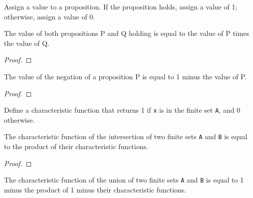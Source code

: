 \begin{definition}\label{toInt}
  \leanok
  Assign a value to a proposition. If the proposition holds, assign a value of 1; otherwise, assign a value of 0.
\end{definition}

\begin{lemma}\label{toInt_and}
  \leanok
  The value of both propositions P and Q holding is equal to the value of P times the value of Q.
\end{lemma}

\begin{proof}
  \leanok
\end{proof}

\begin{lemma}\label{toInt_not}
  \leanok
  The value of the negation of a proposition P is equal to 1 minus the value of P.
\end{lemma}

\begin{proof}
  \leanok
\end{proof}

\begin{definition}\label{char_fun}
  \leanok
  Define a characteristic function that returns 1 if \verb|x| is in the finite set \verb|A|, and 0 otherwise.
\end{definition}

\begin{lemma}\label{char_fun_inter}
  \leanok
  The characteristic function of the intersection of two finite sets \verb|A| and \verb|B| is equal to the product of their characteristic functions.
\end{lemma}

\begin{proof}
  \leanok
\end{proof}

\begin{lemma}\label{char_fun_union}
  \leanok
  The characteristic function of the union of two finite sets \verb|A| and \verb|B| is equal to 1 minus the product of 1 minus their characteristic functions.
\end{lemma}

